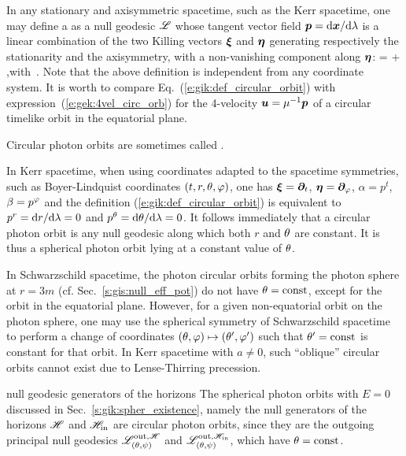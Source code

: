 In any stationary and axisymmetric spacetime, such as the Kerr spacetime, one may
define a 
as a null geodesic $\mathscr{L}$ whose tangent vector field $\bm{p}=\mathrm{d}\bm{x}/\mathrm{d}\lambda$ is a linear combination
of the two Killing vectors $\bm{\xi}$ and $\bm{\eta}$ generating respectively
the stationarity and the axisymmetry, with a non-vanishing component along $\bm{\eta}$:
\be \label{e:gik:def_circular_orbit}
     = \alpha \w{\xi} + \beta \w{\eta} ,\quad\mbox{with}\ \beta {}.
\ee
Note that the above definition is independent from any coordinate system.
It is worth to compare Eq.~(\ref{e:gik:def_circular_orbit}) with expression~(\ref{e:gek:4vel_circ_orb}) for the 4-velocity $\bm{u} = \mu^{-1}\bm{p}$ of a circular timelike orbit in the equatorial plane.

\begin{remark}
Circular photon orbits are sometimes called 
\cite{CunhaH18}.
\end{remark}

In Kerr spacetime, when using coordinates adapted to the spacetime symmetries,
such as Boyer-Lindquist coordinates $(t,r,\theta,\varphi)$, one has $\bm{\xi} = \bm{\partial}_t$,
$\bm{\eta}=\bm{\partial}_\varphi$, $\alpha=p^t$, $\beta=p^\varphi$ and the definition (\ref{e:gik:def_circular_orbit})
is equivalent to $p^r = \mathrm{d} r/\mathrm{d}\lambda = 0$ and $p^\theta = \mathrm{d}\theta/\mathrm{d}\lambda = 0$. It follows immediately
that a circular photon orbit is any null geodesic
along which both $r$ and $\theta$ are constant. It is thus a spherical photon orbit lying at a constant
value of $\theta$.

\begin{remark}
In Schwarzschild spacetime, the photon circular orbits forming the photon sphere
at $r=3m$ (cf. Sec.~\ref{s:gis:null_eff_pot}) do not have $\theta=\mathrm{const}$, except
for the orbit in the equatorial plane. However, for a given non-equatorial
orbit on the photon sphere, one may use the spherical symmetry of Schwarzschild spacetime
to perform a change of coordinates $(\theta,\varphi) \mapsto (\theta',\varphi')$ such that
$\theta' = \mathrm{const}$ is constant for that orbit.
In Kerr spacetime with $a\neq 0$, such
``oblique'' circular orbits cannot exist due to Lense-Thirring precession.
\end{remark}

\begin{texample}{null geodesic generators of the horizons}{}
The spherical photon orbits with $E=0$ discussed in Sec.~\ref{s:gik:spher_existence},
namely the null generators of the horizons $\mathscr{H}$ and $\mathscr{H}_{\rm in}$ are
circular photon orbits, since they are the outgoing principal
null geodesics $\mathscr{L}^{{\rm out},\mathscr{H}}_{(\theta,\psi)}$ and $\mathscr{L}^{{\rm out},\mathscr{H}_{\rm in}}_{(\theta,\psi)}$, which have $\theta=\mathrm{const}$.
\end{texample}

